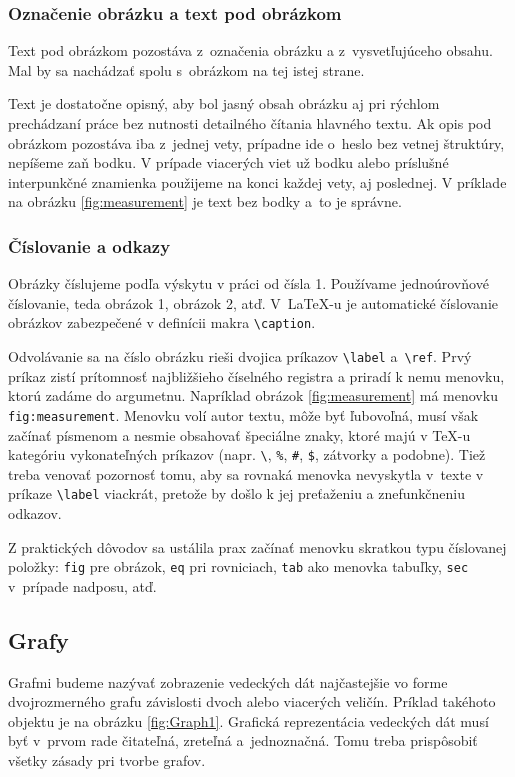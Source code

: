 \subsubsection{Označenie obrázku a text pod obrázkom}
Text pod obrázkom pozostáva z~označenia obrázku a z~vysvetľujúceho obsahu.
Mal by sa nachádzať spolu s~obrázkom na tej istej strane.

Text je dostatočne opisný,
aby bol jasný obsah obrázku aj pri rýchlom prechádzaní
práce bez nutnosti detailného čítania hlavného textu.
Ak opis pod obrázkom pozostáva iba z~jednej vety,
prípadne ide o~heslo bez vetnej štruktúry,
nepíšeme zaň bodku.
V prípade viacerých viet už bodku alebo príslušné interpunkčné 
znamienka použijeme na konci každej vety,
aj poslednej.
V príklade na obrázku \ref{fig:measurement} je text bez bodky
a~to je správne.

\subsubsection{Číslovanie a odkazy}
Obrázky číslujeme podľa výskytu v práci od čísla 1.
Používame jednoúrovňové číslovanie,
teda obrázok 1, obrázok 2, atď.
V~\LaTeX-u je automatické číslovanie obrázkov zabezpečené v definícii makra \verb|\caption|.

Odvolávanie sa na číslo obrázku rieši dvojica príkazov \verb|\label| a~\verb|\ref|.
Prvý príkaz zistí prítomnosť najbližšieho číselného
registra a priradí k nemu menovku, ktorú zadáme do argumetnu. 
Napríklad obrázok \ref{fig:measurement} má menovku \verb|fig:measurement|. Menovku volí autor textu, môže byť ľubovoľná, musí však začínať písmenom a nesmie obsahovať špeciálne znaky, ktoré majú v \TeX-u kategóriu vykonateľných príkazov (napr. \verb|\|, \verb|%|, \verb|#|, \verb|$|, zátvorky a podobne). Tiež treba venovať pozornosť tomu, aby sa rovnaká menovka nevyskytla v~texte v príkaze \verb|\label| viackrát, pretože by došlo k jej preťaženiu a znefunkčneniu odkazov.

Z praktických dôvodov sa ustálila prax začínať menovku skratkou typu číslovanej položky: \verb|fig| pre obrázok, \verb|eq| pri rovniciach, \verb|tab| ako menovka tabuľky, \verb|sec| v~prípade nadposu, atď.

\subsection{Grafy}
Grafmi budeme nazývať zobrazenie vedeckých dát 
najčastejšie vo forme dvojrozmerného grafu 
závislosti dvoch alebo viacerých veličín.
Príklad takéhoto objektu je na obrázku \ref{fig:Graph1}.
Grafická reprezentácia vedeckých dát musí byť
v~prvom rade čitateľná, zreteľná a~jednoznačná.
Tomu treba prispôsobiť všetky zásady pri tvorbe grafov.

